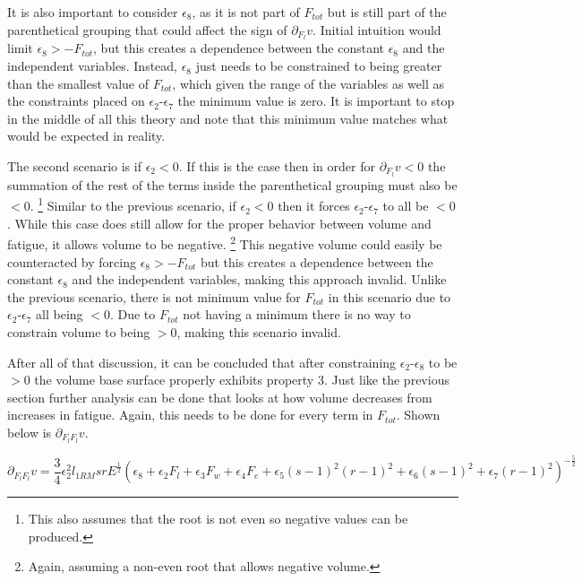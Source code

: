 It is also important to consider $\epsilon_8$, as it is not part of $F_{tot}$ but is still part of the parenthetical grouping that could affect the sign of $\partial_{F_l}v$. Initial intuition would limit $\epsilon_8>-F_{tot}$, but this creates a dependence between the constant $\epsilon_8$ and the independent variables. Instead, $\epsilon_8$ just needs to be constrained to being greater than the smallest value of $F_{tot}$, which given the range of the variables as well as the constraints placed on $\epsilon_2$-$\epsilon_7$ the minimum value is zero. It is important to stop in the middle of all this theory and note that this minimum value matches what would be expected in reality.

The second scenario is if $\epsilon_2<0$. If this is the case then in order for $\partial_{F_l}v<0$ the summation of the rest of the terms inside the parenthetical grouping must also be $<0$. \footnote{This also assumes that the root is not even so negative values can be produced.} Similar to the previous scenario, if $\epsilon_2<0$ then it forces $\epsilon_2$-$\epsilon_7$ to all be $<0$. While this case does still allow for the proper behavior between volume and fatigue, it allows volume to be negative. \footnote{Again, assuming a non-even root that allows negative volume.} This negative volume could easily be counteracted by forcing $\epsilon_8>-F_{tot}$ but this creates a dependence between the constant $\epsilon_8$ and the independent variables, making this approach invalid. Unlike the previous scenario, there is not minimum value for $F_{tot}$ in this scenario due to $\epsilon_2$-$\epsilon_7$ all being $<0$. Due to $F_{tot}$ not having a minimum there is no way to constrain volume to being $>0$, making this scenario invalid.

After all of that discussion, it can be concluded that after constraining $\epsilon_2$-$\epsilon_8$ to be $>0$ the volume base surface properly exhibits property 3. Just like the previous section further analysis can be done that looks at how volume decreases from increases in fatigue. Again, this needs to be done for every term in $F_{tot}$. Shown below is $\partial_{F_lF_l}v$.

\begin{equation*}
	\partial_{F_lF_l}v=
		\frac{3}{4}
    		\epsilon_2^2 l_{1RM} sr E^{\frac{1}{2}}
    		\left(
	    		\epsilon_8+
    			\epsilon_2 F_l+
    			\epsilon_3 F_w+
    			\epsilon_4 F_e+
    			\epsilon_5 (s-1)^2(r-1)^2+
    			\epsilon_6 (s-1)^2+
    			\epsilon_7 (r-1)^2
    		\right)^{-\frac{5}{2}}
\end{equation*}

